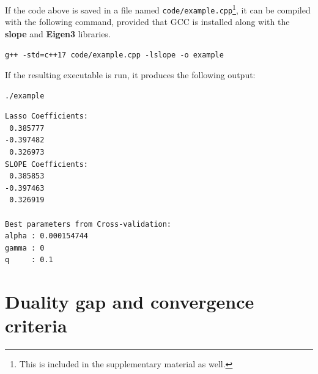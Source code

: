 \documentclass[a4paper,fleqn]{cas-sc}
\begin{document}
If the code above is saved in a file named
\texttt{code/example.cpp}\footnote{This is included in the supplementary
material as well.}, it can be compiled with the following command, provided that
GCC is installed along with the \textbf{slope} and \textbf{Eigen3} libraries.
\begin{Verbatim}
g++ -std=c++17 code/example.cpp -lslope -o example 
  \end{Verbatim}

If the resulting executable is run, it produces the following output:

\begin{Verbatim}
./example
  \end{Verbatim}
\begin{Verbatim}
Lasso Coefficients:
 0.385777
-0.397482
 0.326973
SLOPE Coefficients:
 0.385853
-0.397463
 0.326919

Best parameters from Cross-validation:
alpha : 0.000154744
gamma : 0
q     : 0.1
    \end{Verbatim}

\section{Duality gap and convergence criteria}
\label{sec:convergence-criteria-details}
\end{document}
